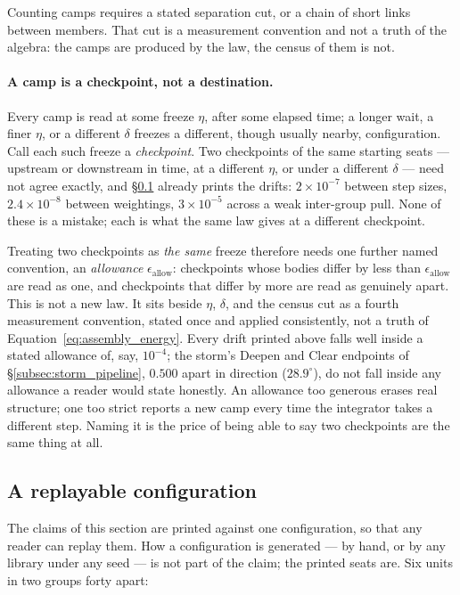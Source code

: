 \documentclass[12pt, a4paper]{article}
\begin{document}
Counting camps requires a stated separation cut, or a chain of short
links between members. That cut is a measurement convention and not
a truth of the algebra: the camps are produced by the law, the
census of them is not.

\paragraph{A camp is a checkpoint, not a destination.}
Every camp is read at some freeze $\eta$, after some elapsed time; a
longer wait, a finer $\eta$, or a different $\delta$ freezes a
different, though usually nearby, configuration. Call each such
freeze a \emph{checkpoint}. Two checkpoints of the same starting
seats --- upstream or downstream in time, at a different $\eta$, or
under a different $\delta$ --- need not agree exactly, and
\S\ref{subsec:enclosure_replay} already prints the drifts: $2\times
10^{-7}$ between step sizes, $2.4\times10^{-8}$ between weightings,
$3\times10^{-5}$ across a weak inter-group pull. None of these is a
mistake; each is what the same law gives at a different checkpoint.

Treating two checkpoints as \emph{the same} freeze therefore
needs one further named convention, an \emph{allowance}
$\epsilon_{\text{allow}}$: checkpoints whose bodies differ by less
than $\epsilon_{\text{allow}}$ are read as one, and checkpoints that
differ by more are read as genuinely apart. This is not a new law.
It sits beside $\eta$, $\delta$, and the census cut as a fourth
measurement convention, stated once and applied consistently, not a
truth of Equation~\eqref{eq:assembly_energy}. Every drift printed
above falls well inside a stated allowance of, say, $10^{-4}$; the
storm's Deepen and Clear endpoints of \S\ref{subsec:storm_pipeline},
$0.500$ apart in direction ($28.9^\circ$), do not fall inside any
allowance a reader would state honestly. An allowance too generous
erases real structure; one too strict reports a new camp
every time the integrator takes a different step. Naming it is the
price of being able to say two checkpoints are the same thing at
all.

\subsection{A replayable configuration}
\label{subsec:enclosure_replay}
The claims of this section are printed against one configuration, so
that any reader can replay them. How a configuration is generated ---
by hand, or by any library under any seed --- is not part of the
claim; the printed seats are. Six units in two groups forty apart:
\end{document}
